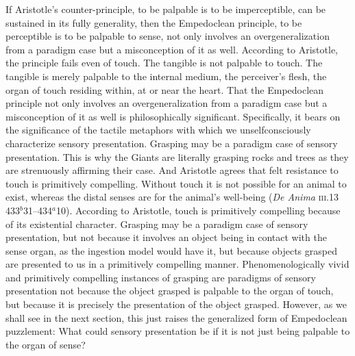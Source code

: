 If Aristotle's counter-principle, to be palpable is to be imperceptible, can be sustained in its fully generality, then the Empedoclean principle, to be perceptible is to be palpable to sense, not only involves an overgeneralization from a paradigm case but a misconception of it as well. According to Aristotle, the principle fails even of touch. The tangible is not palpable to touch. The tangible is merely palpable to the internal medium, the perceiver's flesh, the organ of touch residing within, at or near the heart. That the Empedoclean principle not only involves an overgeneralization from a paradigm case but a misconception of it as well is philosophically significant. Specifically, it bears on the significance of the tactile metaphors with which we unselfconsciously characterize sensory presentation. Grasping may be a paradigm case of sensory presentation. This is why the Giants are literally grasping rocks and trees as they are strenuously affirming their case. And Aristotle agrees that felt resistance to touch is primitively compelling. Without touch it is not possible for an animal to exist, whereas the distal senses are for the animal's well-being (\emph{De Anima} \textsc{iii}.13 433\( ^{b} \)31--434\( ^{a} \)10). According to Aristotle, touch is primitively compelling because of its existential character. Grasping may be a paradigm case of sensory presentation, but not because it involves an object being in contact with the sense organ, as the ingestion model would have it, but because objects grasped are presented to us in a primitively compelling manner. Phenomenologically vivid and primitively compelling instances of grasping are paradigms of sensory presentation not because the object grasped is palpable to the organ of touch, but because it is precisely the presentation of the object grasped. However, as we shall see in the next section, this just raises the generalized form of Empedoclean puzzlement: What could sensory presentation be if it is not just being palpable to the organ of sense?

